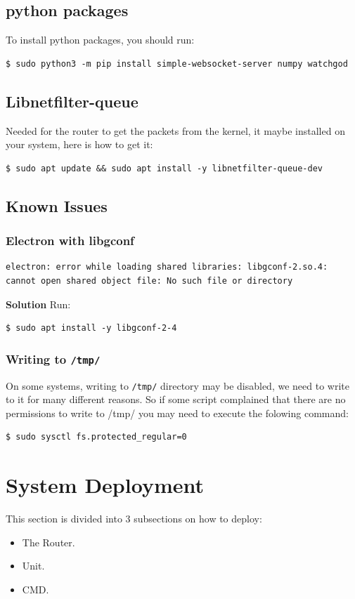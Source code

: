 \subsection{python packages}
To install python packages, you should run:
\begin{verbatim}
$ sudo python3 -m pip install simple-websocket-server numpy watchgod
\end{verbatim}

\subsection{Libnetfilter-queue}
Needed for the router to get the packets from the kernel, it maybe installed on your system, here is how to get it:
\begin{verbatim}
$ sudo apt update && sudo apt install -y libnetfilter-queue-dev
\end{verbatim}

\subsection{Known Issues}
\subsubsection{Electron with libgconf}
\begin{verbatim}
electron: error while loading shared libraries: libgconf-2.so.4: cannot open shared object file: No such file or directory    
\end{verbatim}
\textbf{Solution} Run:
\begin{verbatim}
$ sudo apt install -y libgconf-2-4
\end{verbatim}

\subsubsection{Writing to \texttt{/tmp/}}
On some systems, writing to \texttt{/tmp/} directory may be disabled, we need to write to it for many different reasons.
So if some script complained that there are no permissions to write to /tmp/ you may need to execute the folowing command:
\begin{verbatim}
$ sudo sysctl fs.protected_regular=0
\end{verbatim}

\section{System Deployment}
This section is divided into 3 subsections on how to deploy:
\begin{itemize}[itemsep=1pt, topsep=5pt]
    \item The Router.
    \item Unit.
    \item CMD.
\end{itemize}

